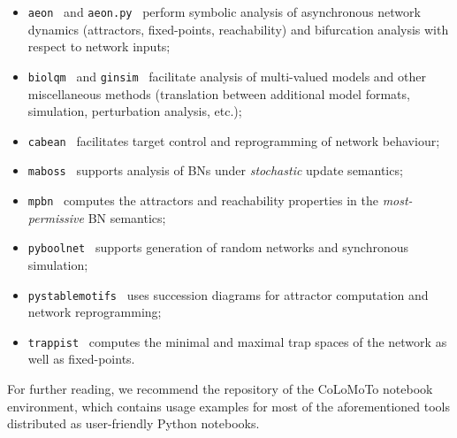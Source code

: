 \documentclass[fleqn,10pt]{wlscirep}
\begin{document}
\begin{itemize}
	\item \texttt{aeon}~\cite{aeon} and \texttt{aeon.py}~\cite{aeonpy} perform symbolic analysis of asynchronous network dynamics (attractors, fixed-points, reachability) and bifurcation analysis with respect to network inputs;
	\item \texttt{biolqm}~\cite{biolqm} and \texttt{ginsim}~\cite{ginsim} facilitate analysis of multi-valued models and other miscellaneous methods (translation between additional model formats, simulation, perturbation analysis, etc.);
	\item \texttt{cabean}~\cite{cabean} facilitates target control and reprogramming of network behaviour;
	\item \texttt{maboss}~\cite{maboss} supports analysis of BNs under \emph{stochastic} update semantics;
	\item \texttt{mpbn}~\cite{mpbn} computes the attractors and reachability properties in the \emph{most-permissive} BN semantics;
	\item \texttt{pyboolnet}~\cite{pyboolnet} supports generation of random networks and synchronous simulation;
	\item \texttt{pystablemotifs}~\cite{pystablemotifs} uses succession diagrams for attractor computation and network reprogramming;
	\item \texttt{trappist}~\cite{trappist} computes the minimal and maximal trap spaces of the network as well as fixed-points.
\end{itemize}

For further reading, we recommend the repository of the CoLoMoTo notebook environment, which contains usage examples for most of the aforementioned tools distributed as user-friendly Python notebooks.


\end{document}
